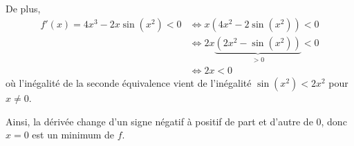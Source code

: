 \begin{exercice}[Extremum]
\begin{enumerate}
    De plus, 
    \begin{align*}
    f'(x) = 4 x^3 - 2 x \sin(x^2) < 0 & \iff x \left(4x^2 - 2\sin(x^2) \right) < 0 \\
    &\iff 2x \underbrace{\left(2x^2 - \sin(x^2) \right)}_{> 0} < 0 \\
    &\iff 2x < 0
    \end{align*}
    où l'inégalité de la seconde équivalence vient de l'inégalité $\sin(x^2) < 2x^2$ pour $x \neq 0$.
  
    Ainsi, la dérivée change d'un signe négatif à positif de part et d'autre de $0$, donc $x = 0$ est un minimum de $f$.
\end{enumerate}

\end{exercice}